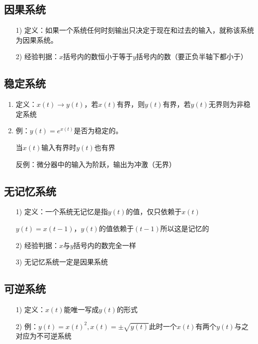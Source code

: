 \documentclass{ctexart}
\numberwithin{figure}{section}
\numberwithin{equation}{section}
\begin{document}
        \subsection{因果系统}
            \begin{enumerate}
                \item[1)] 定义：如果一个系统任何时刻输出只决定于现在和过去的输入，就称该系统为因果系统。
                \item[2)] 经验判据：$x$括号内的数恒小于等于$y$括号内的数（要正负半轴下都小于）
            \end{enumerate}
        \subsection{稳定系统}
            \begin{enumerate}
                \item 定义：$x(t)\rightarrow y(t)$，若$x(t)$有界，则$y(t)$有界，若$y(t)$无界则为非稳定系统
                \item 例：$y(t)=e^{x(t)}$是否为稳定的。
                
                        当$x(t)$输入有界时$y(t)$也有界

                        反例：微分器中的输入为阶跃，输出为冲激（无界）
            \end{enumerate}
        \subsection{无记忆系统}
            \begin{enumerate}
                
            
            \item[1)] 定义：一个系统无记忆是指$y(t)$的值，仅只依赖于$x(t)$

            $y(t)=x(t-1)$，$y(t)$的值依赖于$(t-1)$所以这是记忆的

            \item[2)] 经验判据：$x$与$y$括号内的数完全一样
            \item[3)] 无记忆系统一定是因果系统
            \end{enumerate}
        \subsection{可逆系统}
            \begin{enumerate}
                \item[1)] 定义：$x(t)$能唯一写成$y(t)$的形式
                \item[2)] 例：$y(t)=x(t)^2,x(t)=\pm \sqrt{y(t)}$此时一个$x(t)$有两个$y(t)$与之对应为不可逆系统  
            \end{enumerate}
\newpage
\end{document}
